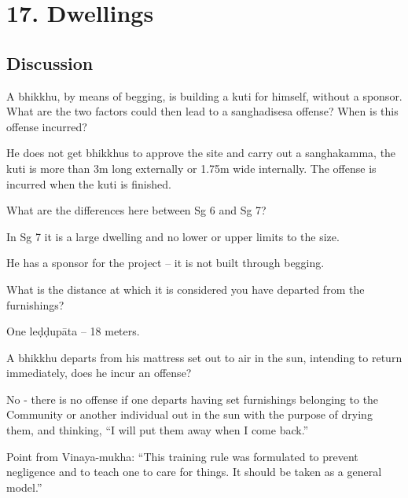\chapter{17. Dwellings}
\renewcommand*{\theChapterTitle}{17. Dwellings}

\section*{Discussion}


A bhikkhu, by means of begging, is building a kuti for himself, without a
sponsor. What are the two factors could then lead to a sanghadisesa offense?
When is this offense incurred?

\begin{solution}
  He does not get bhikkhus to approve the site and carry out a sanghakamma, the
  kuti is more than 3m long externally or 1.75m wide internally. The offense is
  incurred when the kuti is finished.
\end{solution}

\bigskip


What are the differences here between Sg 6 and Sg 7?

\begin{solution}
  In Sg 7 it is a large dwelling and no lower or upper limits to the size.

  He has a sponsor for the project – it is not built through begging. 
\end{solution}

\bigskip


What is the distance at which it is considered you have departed from the furnishings?

\begin{solution}
  One leḍḍupāta -- 18 meters.
\end{solution}

\bigskip

A bhikkhu departs from his mattress set out to air in the sun, intending to
return immediately, does he incur an offense?

\begin{solution}
  No - there is no offense if one departs having set furnishings belonging to
  the Community or another individual out in the sun with the purpose of drying
  them, and thinking, “I will put them away when I come back.”

  Point from Vinaya-mukha: “This training rule was formulated to prevent
  negligence and to teach one to care for things. It should be taken as a
  general model.”
\end{solution}

